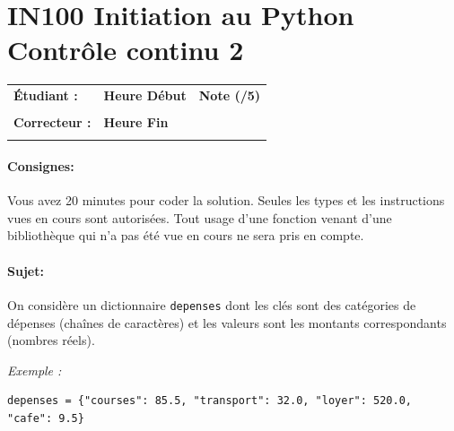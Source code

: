 \documentclass[a4paper,11pt]{article}
\begin{document}
\newtheorem{theo}{Theorem}
\newtheorem{coro}{Corollary}[theo]
\newtheorem{lemme}{Lemma}
\renewcommand{\thecoro}{\thetheo.\arabic{coro}}



\parindent=0cm


\section*{\center IN100 Initiation au Python\\
Contrôle continu 2}

\vspace{-0.3 cm}

\begin{table}[h!]
\centering
\renewcommand{\arraystretch}{1.4} %
\begin{tabular}{|p{10cm}|p{3cm}|p{2cm}|}
\hline
\textbf{Étudiant :} & \textbf{Heure Début }  & \textbf{Note (/5) }  \\
& & \\
\hline
\textbf{Correcteur :} & \textbf{Heure Fin } & \\
& & \\
\hline

\hline
\end{tabular}
\end{table}
\vspace{-0.4 cm}
\paragraph*{Consignes:} Vous avez 20 minutes pour coder la solution. Seules les types et les instructions vues en cours sont autorisées. Tout usage d'une fonction 
venant d'une bibliothèque qui n'a pas été vue en cours ne sera pris en compte. 

\vspace{-0.2 cm}
\paragraph*{Sujet:}

On considère un dictionnaire \texttt{depenses} dont les clés sont des catégories de dépenses
(chaînes de caractères) et les valeurs sont les montants correspondants (nombres réels).

\medskip

\textit{Exemple :}
\begin{verbatim}
depenses = {"courses": 85.5, "transport": 32.0, "loyer": 520.0, "cafe": 9.5}
\end{verbatim}
\end{document}
